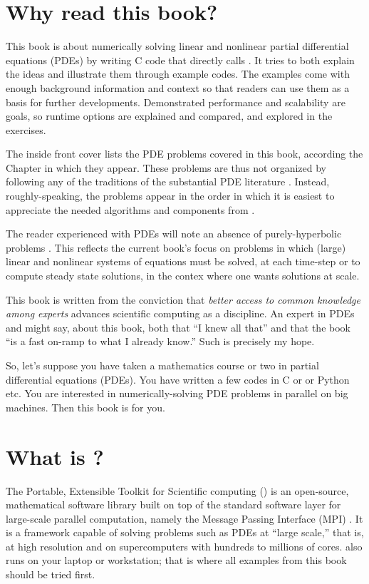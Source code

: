 
\section{Why read this book?}

This book is about numerically solving linear and nonlinear partial differential equations (PDEs) by writing C code \citep{KernighanRitchie1988} that directly calls \PETSc.  It tries to both explain the ideas and illustrate them through example codes.  The examples come with enough background information and context so that readers can use them as a basis for further developments.  Demonstrated performance and scalability are goals, so runtime options are explained and compared, and explored in the exercises.

The inside front cover lists the PDE problems covered in this book, according the Chapter in which they appear.  These problems are thus not organized by following any of the traditions of the substantial PDE literature \citep[for just a start]{Evans2010,Ockendonetal2003}.  Instead, roughly-speaking, the problems appear in the order in which it is easiest to appreciate the needed algorithms and components from \PETSc.

The reader experienced with PDEs will note an absence of purely-hyperbolic problems \citep[compare][]{LeVeque2002}.  This reflects the current book's focus on problems in which (large) linear and nonlinear systems of equations must be solved, at each time-step or to compute steady state solutions, in the contex where one wants solutions at scale.

This book is written from the conviction that \emph{better access to common knowledge among experts} advances scientific computing as a discipline.  An expert in PDEs and \PETSc might say, about this book, both that ``I knew all that'' and that the book ``is a fast on-ramp to what I already know.''  Such is precisely my hope.

So, let's suppose you have taken a mathematics course or two in partial differential equations (PDEs).  You have written a few codes in C or \Matlab or Python etc.  You are interested in numerically-solving PDE problems in parallel on big machines.  Then this book is for you.

\section{What is \PETSc?}

The Portable, Extensible Toolkit for Scientific computing (\PETSc) is an open-source, mathematical software library built on top of the standard software layer for large-scale parallel computation, namely the Message Passing Interface (MPI) \citep{Groppetal1999}.  It is a framework capable of solving problems such as PDEs at ``large scale,'' that is, at high resolution and on supercomputers with hundreds to millions of cores.  \PETSc also runs on your laptop or workstation; that is where all examples from this book should be tried first.

